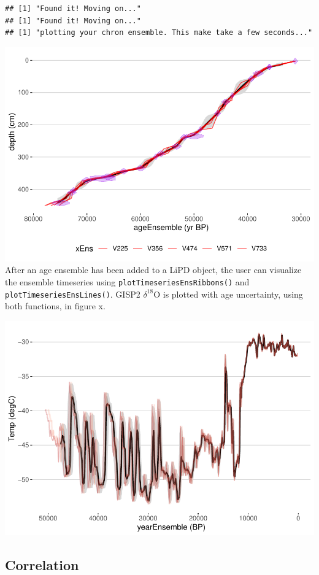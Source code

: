 \documentclass[gc, manuscript]{copernicus}
\begin{document}
\begin{verbatim}
## [1] "Found it! Moving on..."
## [1] "Found it! Moving on..."
## [1] "plotting your chron ensemble. This make take a few seconds..."
\end{verbatim}

\includegraphics{geoChronR-paper_files/figure-latex/unnamed-chunk-3-1.pdf}
After an age ensemble has been added to a LiPD object, the user can visualize the ensemble timeseries using \texttt{plotTimeseriesEnsRibbons()} and \texttt{plotTimeseriesEnsLines()}.
GISP2 \(\delta^{18}\)O is plotted with age uncertainty, using both functions, in figure x.

\includegraphics{geoChronR-paper_files/figure-latex/unnamed-chunk-5-1.pdf}

\subsection{Correlation}
\end{document}
